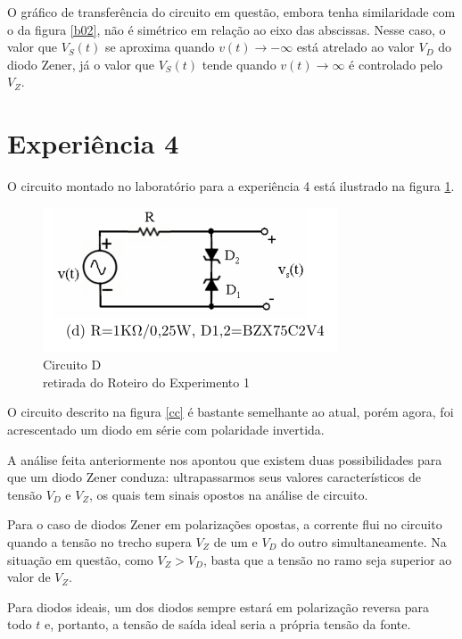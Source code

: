\documentclass[10pt, final, a4paper]{IEEEtran} %
\begin{document}
O gráfico de transferência do circuito em questão, embora tenha similaridade com o da figura \ref{b02}, não é simétrico em relação ao eixo das abscissas. Nesse caso, o valor que $V_S(t)$ se aproxima quando $v(t) \rightarrow - \infty $ está atrelado ao valor $V_D$ do diodo Zener, já o valor que $V_S(t)$ tende quando $v(t) \rightarrow \infty $ é controlado pelo $V_Z$.

\section{Experiência 4}

O circuito montado no laboratório para a experiência 4 está ilustrado na figura \ref{cd}.

\begin{figure}[ht!]
	\captionsetup{justification=centering}
	\centering
	\includegraphics[width=0.8\linewidth]{imagens/circuitos_rel/cd.png}
	\caption{Circuito D\\ retirada do Roteiro do Experimento 1}
	\label{cd}
\end{figure}
\FloatBarrier

O circuito descrito na figura \ref{cc} é bastante semelhante ao atual, porém agora, foi acrescentado um diodo em série com polaridade invertida.

A análise feita anteriormente nos apontou que existem duas possibilidades para que um diodo Zener conduza: ultrapassarmos seus valores característicos de tensão $V_D$ e $V_Z$, os quais tem sinais opostos na análise de circuito.

Para o caso de diodos Zener em polarizações opostas, a corrente flui no circuito quando a tensão no trecho supera $V_Z$ de um e $V_D$ do outro simultaneamente. Na situação em questão, como $V_Z > V_D$, basta que a tensão no ramo seja superior ao valor de $V_Z$.

Para diodos ideais, um dos diodos sempre estará em polarização reversa para todo $t$ e, portanto, a tensão de saída ideal seria a própria tensão da fonte.
\end{document}
